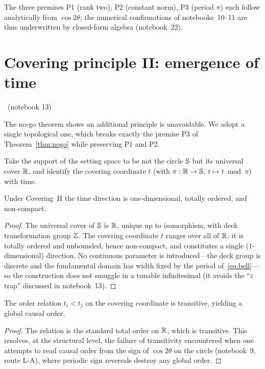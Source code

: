 \documentclass[11pt]{article}
\begin{document}
The three premises P1 (rank two), P2 (constant norm), P3 (period $\pi$) each follow
analytically from $\cos2\theta$; the numerical confirmations of notebooks~10--11 are thus
underwritten by closed-form algebra (notebook~22).

\section{Covering principle II: emergence of time}\label{sec:covering}
\established\ (notebook 13)

The no-go theorem shows an additional principle is unavoidable. We adopt a single
topological one, which breaks exactly the premise P3 of Theorem~\ref{thm:nogo} while
preserving P1 and P2.

\begin{principle}[Covering II]\label{prin:cover}
Take the support of the setting space to be not the circle $\mathbb{S}$ but its universal
cover $\mathbb{R}$, and identify the covering coordinate $t$ (with $\pi:\mathbb{R}\to\mathbb{S}$,
$t\mapsto t \bmod \pi$) with time.
\end{principle}

\begin{proposition}\label{prop:time}
Under Covering~II the time direction is one-dimensional, totally ordered, and non-compact.
\end{proposition}

\begin{proof}
The universal cover of $\mathbb{S}$ is $\mathbb{R}$, unique up to isomorphism, with deck
transformation group $\mathbb{Z}$. The covering coordinate $t$ ranges over all of $\mathbb{R}$: it is
totally ordered and unbounded, hence non-compact, and constitutes a single
($1$-dimensional) direction. No continuous parameter is introduced---the deck group is
discrete and the fundamental domain has width fixed by the period of~\eqref{eq:bell}---so
the construction does not smuggle in a tunable infinitesimal (it avoids the ``$\varepsilon$
trap'' discussed in notebook~13).
\end{proof}

\begin{proposition}\label{prop:causal}
The order relation $t_i<t_j$ on the covering coordinate is transitive, yielding a global
causal order.
\end{proposition}

\begin{proof}
The relation is the standard total order on $\mathbb{R}$, which is transitive. This resolves,
at the structural level, the failure of transitivity encountered when one attempts to
read causal order from the sign of $\cos2\theta$ on the circle (notebook~9, route L-A),
where periodic sign reversals destroy any global order.
\end{proof}
\end{document}
